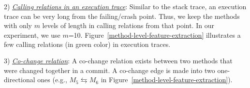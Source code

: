 
2) {\em \underline{Calling relations in an execution trace}}:
Similar to the stack trace, an execution trace can be very long from
the failing/crash point. Thus, we keep the methods with only $m$
levels of length in calling relations from that point. In our
experiment, we use
$m$=10. Figure~\ref{method-level-feature-extraction} illustrates a few
calling relations (in green color) in execution traces.

3) {\em \underline{Co-change relation}}:
A co-change relation exists between two methods that were changed
together in a commit. A co-change edge is made into two
one-directional ones (e.g., $M_5 \leftrightarrows M_6$ in
Figure~\ref{method-level-feature-extraction}).


